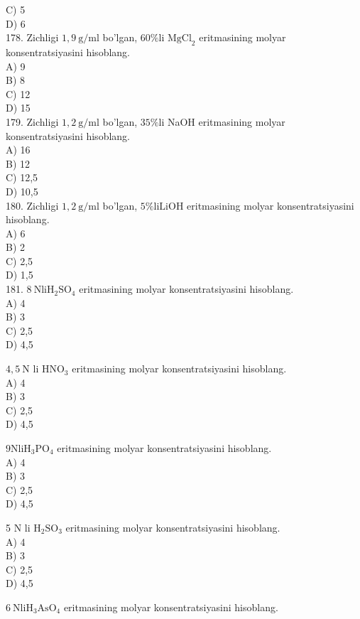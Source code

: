 C) 5\\
D) 6\\
178. Zichligi $1,9 \mathrm{~g} / \mathrm{ml}$ bo'lgan, $60 \% \mathrm{li}$ $\mathrm{MgCl}_{2}$ eritmasining molyar konsentratsiyasini hisoblang.\\
A) 9\\
B) 8\\
C) 12\\
D) 15\\
179. Zichligi $1,2 \mathrm{~g} / \mathrm{ml}$ bo'lgan, $35 \% \mathrm{li}$ NaOH eritmasining molyar konsentratsiyasini hisoblang.\\
A) 16\\
B) 12\\
C) 12,5\\
D) 10,5\\
180. Zichligi $1,2 \mathrm{~g} / \mathrm{ml}$ bo'lgan, $5 \% \mathrm{li} \mathrm{LiOH}$ eritmasining molyar konsentratsiyasini hisoblang.\\
A) 6\\
B) 2\\
C) 2,5\\
D) 1,5\\
181. $8 \mathrm{~N} \mathrm{li} \mathrm{H}_{2} \mathrm{SO}_{4}$ eritmasining molyar konsentratsiyasini hisoblang.\\
A) 4\\
B) 3\\
C) 2,5\\
D) 4,5
  \item $4,5 \mathrm{~N}$ li $\mathrm{HNO}_{3}$ eritmasining molyar konsentratsiyasini hisoblang.\\
A) 4\\
B) 3\\
C) 2,5\\
D) 4,5
  \item $9 \mathrm{Nli} \mathrm{H}_{3} \mathrm{PO}_{4}$ eritmasining molyar konsentratsiyasini hisoblang.\\
A) 4\\
B) 3\\
C) 2,5\\
D) 4,5
  \item 5 N li $\mathrm{H}_{2} \mathrm{SO}_{3}$ eritmasining molyar konsentratsiyasini hisoblang.\\
A) 4\\
B) 3\\
C) 2,5\\
D) 4,5
  \item $6 \mathrm{~N} \mathrm{li} \mathrm{H}_{3} \mathrm{AsO}_{4}$ eritmasining molyar konsentratsiyasini hisoblang.\\

